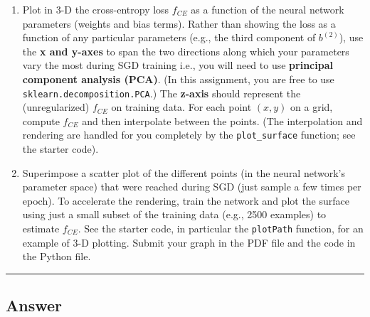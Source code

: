 \documentclass[
  letterpaper,
  DIV=11,
  numbers=noendperiod]{scrartcl}
\newenvironment{Shaded}{\begin{snugshade}}{\end{snugshade}}
\begin{document}
\begin{enumerate}
\def\labelenumi{\arabic{enumi}.}
\item
  Plot in 3-D the cross-entropy loss \(f_{CE}\) as a function of the
  neural network parameters (weights and bias terms). Rather than
  showing the loss as a function of any particular parameters (e.g., the
  third component of \(b^{(2)}\)), use the \textbf{x and y-axes} to span
  the two directions along which your parameters vary the most during
  SGD training i.e., you will need to use \textbf{principal component
  analysis (PCA)}. (In this assignment, you are free to use
  \texttt{sklearn.decomposition.PCA}.) The \textbf{z-axis} should
  represent the (unregularized) \(f_{CE}\) on training data. For each
  point \((x,y)\) on a grid, compute \(f_{CE}\) and then interpolate
  between the points. (The interpolation and rendering are handled for
  you completely by the \texttt{plot\_surface} function; see the starter
  code).
\item
  Superimpose a scatter plot of the different points (in the neural
  network's parameter space) that were reached during SGD (just sample a
  few times per epoch). To accelerate the rendering, train the network
  and plot the surface using just a small subset of the training data
  (e.g., 2500 examples) to estimate \(f_{CE}\). See the starter code, in
  particular the \texttt{plotPath} function, for an example of 3-D
  plotting. Submit your graph in the PDF file and the code in the Python
  file.
\end{enumerate}

\begin{center}\rule{0.5\linewidth}{0.5pt}\end{center}

\subsection{Answer}\label{answer-7}

\begin{Shaded}
\begin{Highlighting}[]

\end{Highlighting}
\end{Shaded}
\end{document}
